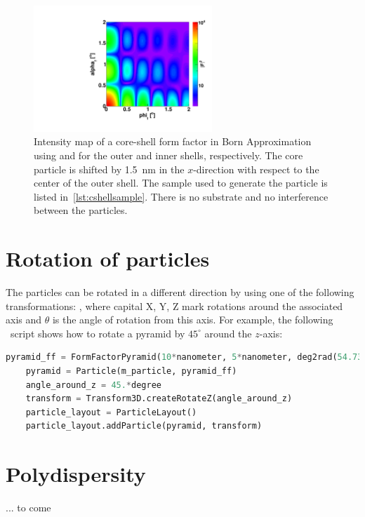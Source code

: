 \begin{figure}[ht]
\begin{center}
\includegraphics[angle=-90,width=0.6\textwidth]{fig/gisasmap/CoreShellParallPyr.pdf}
\end{center}
\caption{Intensity map of a core-shell form factor in Born Approximation using   and  for the outer and inner shells, respectively. The core particle is shifted by 1.5~nm in the $x$-direction with respect to the center of the outer shell. The sample used to generate the particle is listed in~\ref{lst:cshellsample}.  There is no substrate and no interference between the particles.}
\label{fig:FFCoreShellBA}
\end{figure}

\clearpage
\section{Rotation of particles}

The particles can be rotated in a different direction by using one of
the following transformations: , where capital X, Y, Z mark rotations
around the associated axis and $\theta$ is the
angle of rotation from this axis. For example, the following \ script shows how to rotate a pyramid by $45^{\circ}$ around
the $z$-axis:\\

\begin{lstlisting}[language=python, style=eclipseboxed,numbers=none,nolol]
    pyramid_ff = FormFactorPyramid(10*nanometer, 5*nanometer, deg2rad(54.73 ) )
    pyramid = Particle(m_particle, pyramid_ff)
    angle_around_z = 45.*degree
    transform = Transform3D.createRotateZ(angle_around_z)
    particle_layout = ParticleLayout()
    particle_layout.addParticle(pyramid, transform) 
\end{lstlisting}

\section{Polydispersity}

... to come
